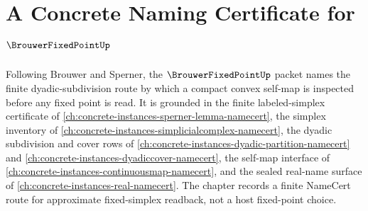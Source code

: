 \chapter{A Concrete Naming Certificate for $\BrouwerFixedPointUp$}
\label{ch:concrete-instances-brouwer-fixed-point-namecert}

Following Brouwer and Sperner, the $\BrouwerFixedPointUp$ packet names the finite dyadic-subdivision route by which a compact convex self-map is inspected before any fixed point is read. It is grounded in the finite labeled-simplex certificate of \autoref{ch:concrete-instances-sperner-lemma-namecert}, the simplex inventory of \autoref{ch:concrete-instances-simplicialcomplex-namecert}, the dyadic subdivision and cover rows of \autoref{ch:concrete-instances-dyadic-partition-namecert} and \autoref{ch:concrete-instances-dyadiccover-namecert}, the self-map interface of \autoref{ch:concrete-instances-continuousmap-namecert}, and the sealed real-name surface of \autoref{ch:concrete-instances-real-namecert}. The chapter records a finite NameCert route for approximate fixed-simplex readback, not a host fixed-point choice.

